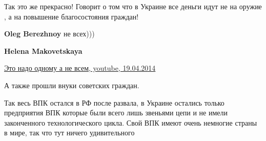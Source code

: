 \begin{itemize}
 

Так это же прекрасно! Говорит о том что в Украине все деньги идут не на оружие
, а на повышение благосостояния граждан!

\begin{itemize}
 
\textbf{Oleg Berezhnoy} не всех)))

 
\textbf{Helena Makovetskaya} 

\href{https://youtu.be/AT_bFpYZ4rw}{%
Это надо одному а не всем, youtube, 19.04.2014%
}

\end{itemize}

 
А также прошли внуки советских граждан.

 

Так весь ВПК остался в РФ после развала, в Украине остались только предприятия
ВПК которые были всего лишь звеньями цепи и не имели законченного
технологического цикла. Свой ВПК имеют очень немногие страны в мире, так что
тут ничего удивительного

\begin{itemize}
 

\end{itemize}
\end{itemize}
